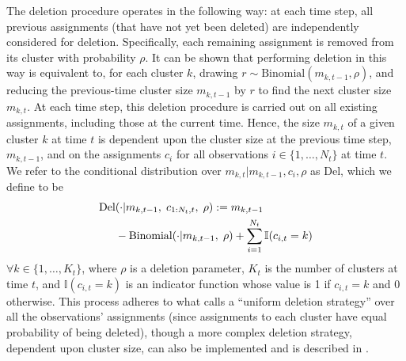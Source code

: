\documentclass[twocolumn, final]{svjour3}
\begin{document}
The deletion procedure operates in the following way: at each time step, all previous assignments (that have not yet been deleted) are independently considered for deletion. Specifically, each remaining assignment is removed from its cluster with probability $\rho$.  It can be shown that performing deletion in this way is equivalent to, for each cluster $k$, drawing $r \sim \text{Binomial}(m_{k,t-1}, \rho)$, and reducing the previous-time cluster size $m_{k,t-1}$ by $r$ to find the next cluster size $m_{k,t}$. At each time step, this deletion procedure is carried out on all existing assignments, including those at the current time. Hence, the size $m_{k,t}$ of a given cluster $k$ at time $t$ is dependent upon the cluster size at the previous time step, $m_{k,t-1}$, and on the assignments $c_{i}$ for all observations $i \in \{ 1, \ldots, N_{t} \}$ at time $t$. We refer to the conditional distribution over $m_{k,t} | m_{k,t-1}, c_{i}, \rho$ as Del, which we define to be
\begin{equation}
\begin{split}
\label{del_step}
\text{Del} &(\cdot | m_{k,t-1}, \hspace{1mm} c_{1:N_{t}, t}, \hspace{1mm} \rho) := m_{k,t-1} \\
&- \text{Binomial}( \cdot | {m_{k,t-1}, \hspace{1mm} \rho}) + \sum_{i=1}^{N_{t}} \mathbb{I}(c_{i,t} = k)
\end{split}
\end{equation}
$\forall k \in \{1, \ldots, K_{t} \}$, where $\rho$ is a deletion parameter, $K_{t}$ is the number of clusters at time $t$, and $\mathbb{I}(c_{i,t} = k)$ is an indicator function whose value is 1 if $c_{i,t} = k$ and 0 otherwise. This process adheres to what \cite{caron_2007} calls a ``uniform deletion strategy'' over all the observations' assignments (since assignments to each cluster have equal probability of being deleted), though a more complex deletion strategy, dependent upon cluster size, can also be implemented and is described in \cite{caron_2007}.
\end{document}
